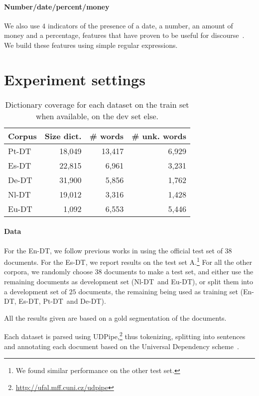 \documentclass[11pt]{article}
\newcommand{\erstdt}{En-DT}
\newcommand{\derst}{De-DT}
\newcommand{\ptrst}{Pt-DT}
\newcommand{\eurst}{Eu-DT}
\newcommand{\esrst}{Es-DT}
\newcommand{\durst}{Nl-DT}
\newcommand{\nlrst}{Nl-DT}
\begin{document}
\paragraph{Number/date/percent/money}
We also use $4$ indicators of the presence of a date, a number, an amount of money and a percentage, features that have proven to be useful for discourse~\cite{pitler:automati:2009}. We build these features using simple regular expressions. 


\section{Experiment settings}
\label{sec:setting}




\begin{table}
\begin{tabular}{lrrr}
\toprule
Corpus & Size dict. & \# words & \# unk. words \\
\midrule
\ptrst &18,049& 13,417 & 6,929\\
\esrst &22,815& 6,961 & 3,231\\
\derst &31,900& 5,856 & 1,762\\
\durst &19,012& 3,316 & 1,428\\
\eurst &1,092 & 6,553 & 5,446\\
\bottomrule
\end{tabular}
\caption{Dictionary coverage for each dataset on the train set when available, on the dev set else.}
\label{table:dictcoverage}
\end{table}

\paragraph{Data} For the \erstdt, we follow previous works in using the official test set of $38$ documents. For the \esrst, we report results on the test set A.\footnote{We found similar performance on the other test set.} For all the other corpora, we randomly choose $38$ documents to make a test set, and either use the remaining documents as development set (\nlrst\ and \eurst), or split them into a development set of $25$ documents, the remaining being used as training set (\erstdt, \esrst, \ptrst\ and \derst).

All the results given are based on a gold segmentation of the documents.

Each dataset is parsed using UDPipe,\footnote{\url{http://ufal.mff.cuni.cz/udpipe}} thus tokenizing, splitting into sentences and annotating each document based on the Universal Dependency scheme~\cite{ud13}. 
\end{document}

